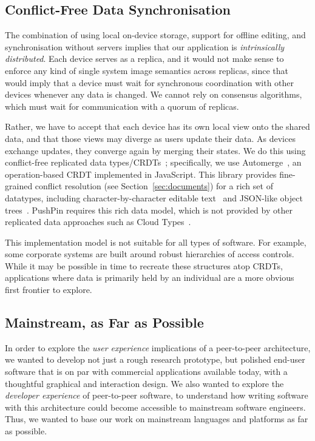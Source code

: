\documentclass[sigplan,10pt]{acmart}
\begin{document}
\subsection{Conflict-Free Data Synchronisation}

The combination of using local on-device storage, support for offline editing, and synchronisation without servers implies that our application is \emph{intrinsically distributed}.
Each device serves as a replica, and it would not make sense to enforce any kind of single system image semantics across replicas, since that would imply that a device must wait for synchronous coordination with other devices whenever any data is changed.
We cannot rely on consensus algorithms, which must wait for communication with a quorum of replicas.

Rather, we have to accept that each device has its own local view onto the shared data, and that those views may diverge as users update their data.
As devices exchange updates, they converge again by merging their states.
We do this using conflict-free replicated data types/CRDTs~\cite{Shapiro:2011un}; specifically, we use Automerge~\cite{Automerge:2018,Automerge}, an operation-based CRDT implemented in JavaScript.
This library provides fine-grained conflict resolution (see Section~\ref{sec:documents}) for a rich set of datatypes, including character-by-character editable text~\cite{Kleppmann:2019iu} and JSON-like object trees~\cite{Kleppmann:2017ca}.
PushPin requires this rich data model, which is not provided by other replicated data approaches such as Cloud Types~\cite{Burckhardt:2012jy}.

This implementation model is not suitable for all types of software. For example, some corporate systems are built around robust hierarchies of access controls. While it may be possible in time to recreate these structures atop CRDTs, applications where data is primarily held by an individual are a more obvious first frontier to explore.   

\subsection{Mainstream, as Far as Possible}

In order to explore the \emph{user experience} implications of a peer-to-peer architecture, we wanted to develop not just a rough research prototype, but polished end-user software that is on par with commercial applications available today, with a thoughtful graphical and interaction design.
We also wanted to explore the \emph{developer experience} of peer-to-peer software, to understand how writing software with this architecture could become accessible to mainstream software engineers.
Thus, we wanted to base our work on mainstream languages and platforms as far as possible.
\end{document}
